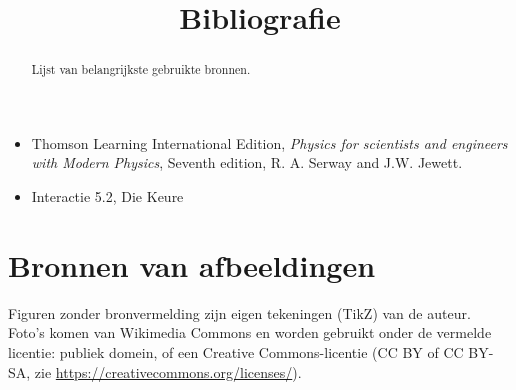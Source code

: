 \documentclass{ximera}
\title{Bibliografie}
\begin{document}
\begin{abstract}
    Lijst van belangrijkste gebruikte bronnen.
\end{abstract}
\maketitle
    

\begin{itemize}
    \item Thomson Learning International Edition, \textit{Physics for scientists and engineers with Modern Physics}, Seventh edition, R. A. Serway and J.W. Jewett.
 
    \item Interactie 5.2, Die Keure
\end{itemize}
 
 
 

\section*{Bronnen van afbeeldingen}
Figuren zonder bronvermelding zijn eigen tekeningen (TikZ) van de auteur. Foto's komen van Wikimedia Commons en worden gebruikt onder de vermelde licentie: publiek domein, of een Creative Commons-licentie (CC BY of CC BY-SA, zie \url{https://creativecommons.org/licenses/}).
\end{document}
